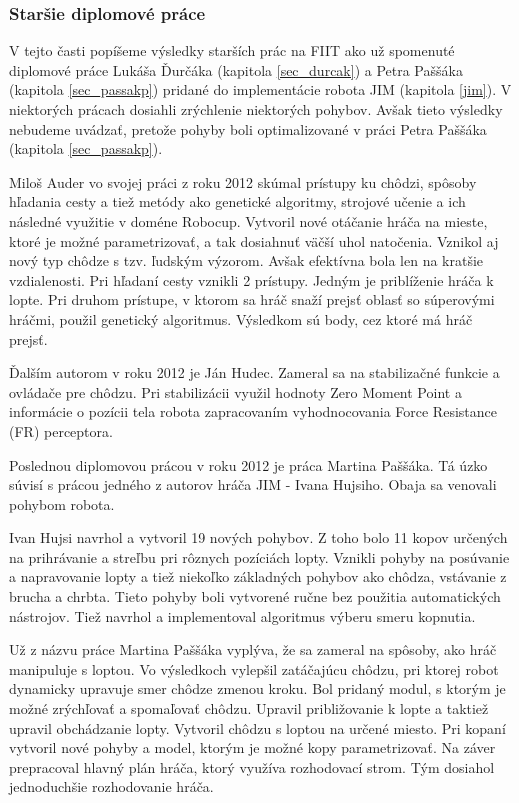 \subsubsection{Staršie diplomové práce}\label{sec_auder_hudec}

V tejto časti popíšeme výsledky starších prác na FIIT ako už spomenuté diplomové práce Lukáša Ďurčáka (kapitola \ref{sec_durcak}) a Petra Paššáka (kapitola \ref{sec_passakp}) pridané do implementácie robota JIM (kapitola \ref{jim}). V niektorých prácach dosiahli zrýchlenie niektorých pohybov. Avšak tieto výsledky nebudeme uvádzať, pretože pohyby boli optimalizované v práci Petra Paššáka (kapitola \ref{sec_passakp}).

Miloš Auder vo svojej práci\cite{auder} z roku 2012 skúmal prístupy ku chôdzi, spôsoby hľadania cesty a tiež metódy ako genetické algoritmy, strojové učenie a ich následné využitie v doméne Robocup. Vytvoril nové otáčanie hráča na mieste, ktoré je možné parametrizovať, a tak dosiahnuť väčší uhol natočenia. Vznikol aj nový typ chôdze s tzv. ľudským výzorom. Avšak efektívna bola len na kratšie vzdialenosti. Pri hľadaní cesty vznikli 2 prístupy. Jedným je priblíženie hráča k lopte. Pri druhom prístupe, v ktorom sa hráč snaží prejsť oblasť so súperovými hráčmi, použil genetický algoritmus. Výsledkom sú body, cez ktoré má hráč prejsť.

Ďalším autorom v roku 2012 je Ján Hudec\cite{hudec}. Zameral sa na stabilizačné funkcie a ovládače pre chôdzu. Pri stabilizácii využil hodnoty Zero Moment Point a informácie o pozícii tela robota zapracovaním vyhodnocovania Force Resistance (FR) perceptora.

Poslednou diplomovou prácou v roku 2012 je práca Martina Paššáka. Tá úzko súvisí s prácou jedného z autorov hráča JIM - Ivana Hujsiho. Obaja sa venovali pohybom robota. 

Ivan Hujsi\cite{Hujsi} navrhol a vytvoril 19 nových pohybov. Z toho bolo 11 kopov určených na prihrávanie a streľbu pri rôznych pozíciách lopty. Vznikli pohyby na posúvanie a napravovanie lopty a tiež niekoľko základných pohybov ako chôdza, vstávanie z brucha a chrbta. Tieto pohyby boli vytvorené ručne bez použitia automatických nástrojov. Tiež navrhol a implementoval algoritmus výberu smeru kopnutia.

Už z názvu práce Martina Paššáka\cite{passak_martin} vyplýva, že sa zameral na spôsoby, ako hráč manipuluje s loptou. Vo výsledkoch vylepšil zatáčajúcu chôdzu, pri ktorej robot dynamicky upravuje smer chôdze zmenou kroku. Bol pridaný modul, s ktorým je možné zrýchľovať a spomaľovať chôdzu. Upravil približovanie k lopte a taktiež upravil obchádzanie lopty. Vytvoril chôdzu s loptou na určené miesto. Pri kopaní vytvoril nové pohyby a model, ktorým je možné kopy parametrizovať. Na záver prepracoval hlavný plán hráča, ktorý využíva rozhodovací strom. Tým dosiahol jednoduchšie rozhodovanie hráča.